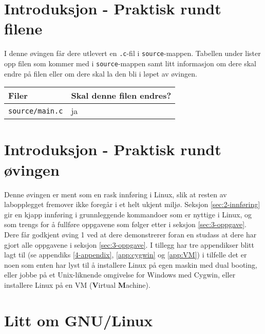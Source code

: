\begin{alphasection}
\section{Introduksjon - Praktisk rundt filene}

I denne øvingen får dere utlevert en \verb|.c|-fil i \verb|source|-mappen. Tabellen under lister opp filen som kommer med i \verb|source|-mappen samt litt informasjon om dere skal endre på filen eller om dere skal la den bli i løpet av øvingen.

\begin{center}
 \begin{tabular}{|p{8.5cm} p{5.5cm}|} 
 \hline
 \textbf{Filer} & \textbf{Skal denne filen endres?}  \\ [0.5ex] 
 \hline\hline
  \verb|source/main.c| & ja  \\ 
 \hline
\end{tabular}
\end{center}

\section{Introduksjon - Praktisk rundt øvingen}
Denne øvingen er ment som en rask innføring i Linux, slik  at resten av labopplegget fremover ikke foregår i et helt ukjent miljø. Seksjon \ref{sec:2-innføring} gir en kjapp innføring i grunnleggende kommandoer som er nyttige i Linux, og som trengs for å fullføre oppgavene som følger etter i seksjon \ref{sec:3-oppgave}. Dere får godkjent øving 1 ved at dere demonstrerer foran en studass at dere har gjort alle oppgavene i seksjon \ref{sec:3-oppgave}. 
I tillegg har tre appendikser blitt lagt til (se appendiks \ref{4-appendix}, \ref{app:cygwin} og \ref{app:VM}) i tilfelle det er noen som enten har lyst til å installere Linux på egen maskin med dual booting, eller jobbe på et Unix-liknende omgivelse for Windows med Cygwin, eller installere Linux på en VM (\textbf{V}irtual \textbf{M}achine).



\section{Litt om GNU/Linux}


\end{alphasection}
